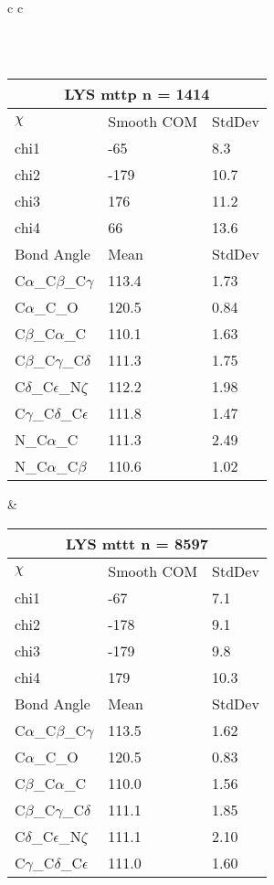 \begin{longtable}{ c c }
\begin{tabular}{ l l l }
  \bottomrule
  \end{tabular}
  \\
  \begin{tabular}{ l l l }
  \toprule
  \multicolumn{3}{c}{LYS \textbf{mttp} n = 1414} \\ \toprule
  $\chi$       & Smooth COM & StdDev \\ \midrule
  chi1 & -65 & 8.3 \\ 
  chi2 & -179 & 10.7 \\ 
  chi3 & 176 & 11.2 \\ 
  chi4 & 66 & 13.6 \\ \midrule
  Bond Angle   & Mean     & StdDev \\ \midrule
  C$\alpha$\_C$\beta$\_C$\gamma$ & 113.4 & 1.73\\
  C$\alpha$\_C\_O & 120.5 & 0.84\\
  C$\beta$\_C$\alpha$\_C & 110.1 & 1.63\\
  C$\beta$\_C$\gamma$\_C$\delta$ & 111.3 & 1.75\\
  C$\delta$\_C$\epsilon$\_N$\zeta$ & 112.2 & 1.98\\
  C$\gamma$\_C$\delta$\_C$\epsilon$ & 111.8 & 1.47\\
  N\_C$\alpha$\_C & 111.3 & 2.49\\
  N\_C$\alpha$\_C$\beta$ & 110.6 & 1.02\\
  \bottomrule
  \end{tabular}
  &
  \begin{tabular}{ l l l }
  \toprule
  \multicolumn{3}{c}{LYS \textbf{mttt} n = 8597} \\ \toprule
  $\chi$       & Smooth COM & StdDev \\ \midrule
  chi1 & -67 & 7.1 \\ 
  chi2 & -178 & 9.1 \\ 
  chi3 & -179 & 9.8 \\ 
  chi4 & 179 & 10.3 \\ \midrule
  Bond Angle   & Mean     & StdDev \\ \midrule
  C$\alpha$\_C$\beta$\_C$\gamma$ & 113.5 & 1.62\\
  C$\alpha$\_C\_O & 120.5 & 0.83\\
  C$\beta$\_C$\alpha$\_C & 110.0 & 1.56\\
  C$\beta$\_C$\gamma$\_C$\delta$ & 111.1 & 1.85\\
  C$\delta$\_C$\epsilon$\_N$\zeta$ & 111.1 & 2.10\\
  C$\gamma$\_C$\delta$\_C$\epsilon$ & 111.0 & 1.60\\

\end{tabular}
\end{longtable}
